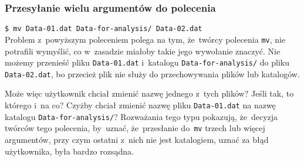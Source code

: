 \documentclass[10pt,t]{beamer}
\begin{document}
\begin{frame}
  \frametitle{Przesyłanie wielu argumentów do polecenia}


  \texttt{\$ mv Data-01.dat Data-for-analysis/ Data-02.dat} \\
  Problem z~powyższym poleceniem polega na tym, że~twórcy polecenia
  \texttt{mv}, nie potrafili wymyślić, co w~zasadzie miałoby takie jego
  wywołanie znaczyć. Nie możemy przenieść pliku \texttt{Data-01.dat}
  i~katalogu \texttt{Data-for-analysis/} do pliku \texttt{Data-02.dat},
  bo przecież plik nie służy do przechowywania plików lub katalogów.

  Może więc użytkownik chciał zmienić nazwę jednego z~tych plików?
  Jeśli tak, to którego i~na co? Czyżby chciał zmienić nazwę pliku
  \texttt{Data-01.dat} na nazwę katalogu \texttt{Data-for-analysis/}?
  Rozważania tego typu pokazują, że~decyzja twórców tego polecenia,
  by~uznać, że~przesłanie do~\texttt{mv} trzech lub więcej argumentów,
  przy czym ostatni z~nich \alert{nie} jest katalogiem, uznać za błąd
  użytkownika, była bardzo rozsądna.




\end{frame}
\end{document}
